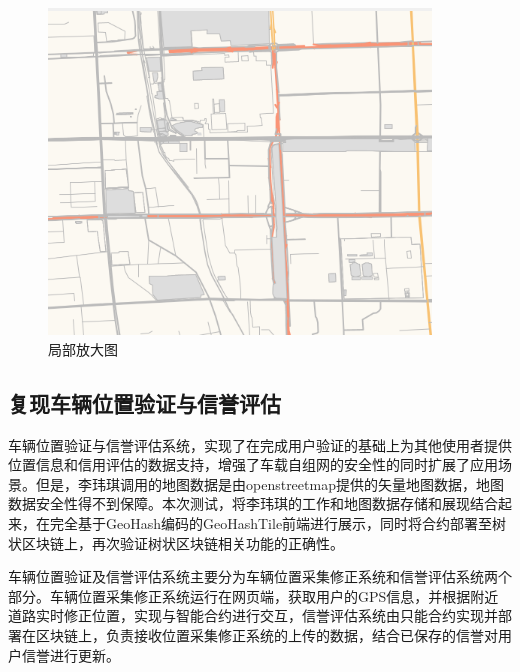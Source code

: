 \begin{figure}[!htb]
    \centering
    \includegraphics[width=4in]{images/8.png}
    \caption{局部放大图}\label{局部放大图} 
\end{figure}

\subsection{复现车辆位置验证与信誉评估}
车辆位置验证与信誉评估系统，实现了在完成用户验证的基础上为其他使用者提供位置信息和信用评估的数据支持，增强了车载自组网的安全性的同时扩展了应用场景\cite{lposition}。但是，李玮琪调用的地图数据是由openstreetmap提供的矢量地图数据，地图数据安全性得不到保障。本次测试，将李玮琪的工作和地图数据存储和展现结合起来，在完全基于GeoHash编码的GeoHashTile前端进行展示，同时将合约部署至树状区块链上，再次验证树状区块链相关功能的正确性。

车辆位置验证及信誉评估系统主要分为车辆位置采集修正系统和信誉评估系统两个部分\cite{lposition}。车辆位置采集修正系统运行在网页端，获取用户的GPS信息，并根据附近道路实时修正位置，实现与智能合约进行交互，信誉评估系统由只能合约实现并部署在区块链上，负责接收位置采集修正系统的上传的数据，结合已保存的信誉对用户信誉进行更新。

